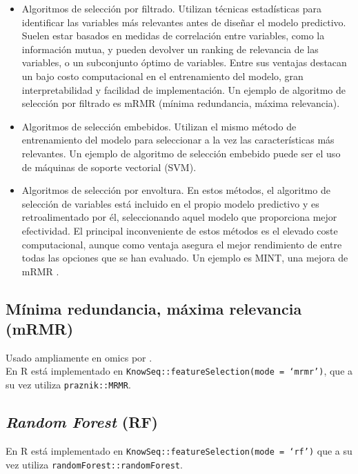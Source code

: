 \begin{itemize}
	\item Algoritmos de selección por filtrado. Utilizan técnicas estadísticas para identificar las variables más relevantes antes de diseñar el modelo predictivo. Suelen estar basados en medidas de correlación entre variables, como la información mutua, y pueden devolver un ranking de relevancia de las variables, o un subconjunto óptimo de variables. Entre sus ventajas destacan un bajo costo computacional en el entrenamiento del modelo, gran interpretabilidad y facilidad de implementación. Un ejemplo de algoritmo de selección por filtrado es mRMR (mínima redundancia, máxima relevancia). 
	
	\item Algoritmos de selección embebidos. Utilizan el mismo método de entrenamiento del modelo para seleccionar a la vez las características más relevantes. Un ejemplo de algoritmo de selección embebido puede ser el uso de máquinas de soporte vectorial (SVM). 
	
	\item Algoritmos de selección por envoltura. En estos métodos, el algoritmo de selección de variables está incluido en el propio modelo predictivo y es retroalimentado por él, seleccionando aquel modelo que proporciona mejor efectividad. El principal inconveniente de estos métodos es el elevado coste computacional, aunque como ventaja asegura el mejor rendimiento de entre todas las opciones que se han evaluado. Un ejemplo es MINT, una mejora de mRMR \cite{He2016}.
\end{itemize}

\subsection{Mínima redundancia, máxima relevancia (mRMR)}

Usado ampliamente en omics por \cite{Ding2005, Yang2013}.\\

En R está implementado en \texttt{KnowSeq::featureSelection(mode = `mrmr')}, que a su vez utiliza \texttt{praznik::MRMR}.

\subsection{\textit{Random Forest} (RF)}

En R está implementado en \texttt{KnowSeq::featureSelection(mode = `rf')} que a su vez utiliza \texttt{randomForest::randomForest}.

